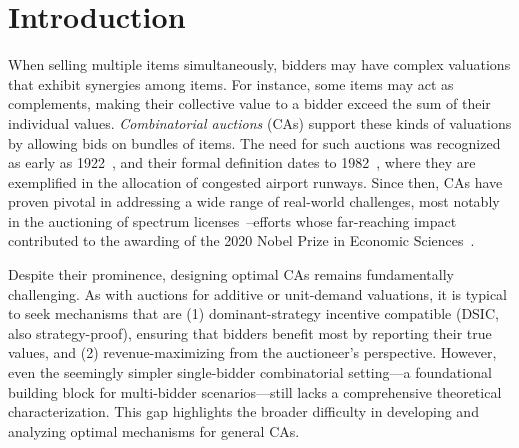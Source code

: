 \section{Introduction}


When selling multiple items simultaneously, bidders may have complex valuations that exhibit synergies among items. For instance, some items may act as complements, making their collective value to a bidder exceed the sum of their individual values. \emph{Combinatorial auctions} (CAs) support these kinds of valuations by allowing bids on bundles of items. The need for such auctions was recognized as early as 1922~\cite{uscongress1925e}, and their formal definition dates to 1982~\cite{rassenti1982combinatorial}, where they are exemplified in the allocation of congested airport runways. Since then, CAs have proven pivotal in addressing a wide range of real-world challenges, most notably in the auctioning of spectrum licenses~\cite{cramton1997fcc,palacios-huerta24}--efforts whose far-reaching impact contributed to the awarding of the 2020 Nobel Prize in Economic Sciences~\cite{NobelPrizeEcon2020}.

Despite their  prominence, designing optimal CAs remains fundamentally challenging. As with auctions for additive or unit-demand valuations, it is typical to seek mechanisms that are (1) dominant-strategy incentive compatible (DSIC, also strategy-proof), ensuring that bidders benefit most by reporting their true values, and (2) revenue-maximizing from the auctioneer's perspective. However, even the seemingly simpler single-bidder combinatorial setting---a foundational building block for multi-bidder scenarios---still lacks a comprehensive theoretical characterization. This gap highlights the broader difficulty in developing and analyzing optimal mechanisms for general CAs.

